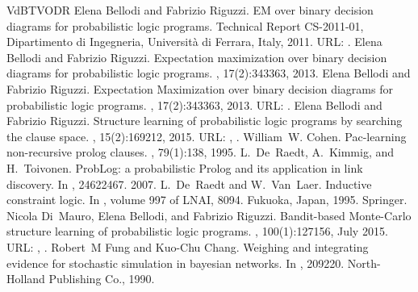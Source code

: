 \documentclass[letterpaper,10pt,english]{sphinxmanual}
\begin{document}
\begin{sphinxthebibliography}{VdBTVODR}
Elena Bellodi and Fabrizio Riguzzi. EM over binary decision diagrams for probabilistic logic programs. Technical Report CS-2011-01, Dipartimento di Ingegneria, Università di Ferrara, Italy, 2011. URL: .
Elena Bellodi and Fabrizio Riguzzi. Expectation maximization over binary decision diagrams for probabilistic logic programs. , 17(2):343\textendash{}363, 2013.
Elena Bellodi and Fabrizio Riguzzi. Expectation Maximization over binary decision diagrams for probabilistic logic programs. , 17(2):343\textendash{}363, 2013. URL: .
Elena Bellodi and Fabrizio Riguzzi. Structure learning of probabilistic logic programs by searching the clause space. , 15(2):169\textendash{}212, 2015. URL: , .
William W. Cohen. Pac-learning non-recursive prolog clauses. , 79(1):1\textendash{}38, 1995.
L. De Raedt, A. Kimmig, and H. Toivonen. ProbLog: a probabilistic Prolog and its application in link discovery. In , 2462\textendash{}2467. 2007.
L. De Raedt and W. Van Laer. Inductive constraint logic. In , volume 997 of LNAI, 80\textendash{}94. Fukuoka, Japan, 1995. Springer.
Nicola Di Mauro, Elena Bellodi, and Fabrizio Riguzzi. Bandit-based Monte-Carlo structure learning of probabilistic logic programs. , 100(1):127\textendash{}156, July 2015. URL: , .
Robert M Fung and Kuo-Chu Chang. Weighing and integrating evidence for stochastic simulation in bayesian networks. In , 209\textendash{}220. North-Holland Publishing Co., 1990.

\end{sphinxthebibliography}
\end{document}
